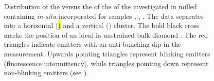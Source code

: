 	\begin{figure}[!htb]
			\centering
			\caption[Spectral distribution of \siv \ZPLs]{Distribution of the \ZPL \cwl versus the \lw of the \ZPL of the investigated \sivs in milled \nds containing \textit{in-situ} incorporated \sivs for samples \insituF, \insituS, \insituH{}. The data separates into a horizontal (\hl) and a vertical (\vl) cluster. The bold black cross marks the position of an ideal \siv in unstrained bulk diamond \cite{Arend2016a}. The red triangles indicate emitters with an anti-bunching dip in the \gtz measurement. Upwards pointing triangles represent blinking emitters (fluorescence intermittency), while triangles pointing down represent non-blinking emitters (see ).}
			\label{fig::bimodal_distr}
	\end{figure}

